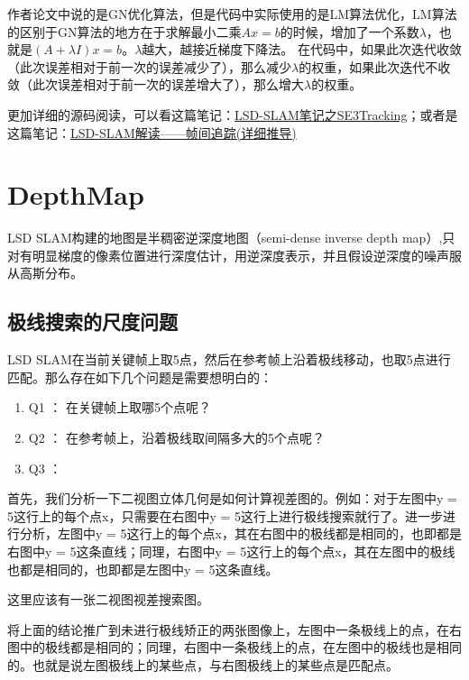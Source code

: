 作者论文中说的是GN优化算法，但是代码中实际使用的是LM算法优化，LM算法的区别于GN算法的地方在于求解最小二乘$Ax=b$的时候，增加了一个系数$\lambda$，也就是$(A+\lambda I)x=b$。$\lambda$越大，越接近梯度下降法。 在代码中，如果此次迭代收敛（此次误差相对于前一次的误差减少了），那么减少$\lambda$的权重，如果此次迭代不收敛（此次误差相对于前一次的误差增大了），那么增大$\lambda$的权重。


更加详细的源码阅读，可以看这篇笔记：\href{https://www.zybuluo.com/kokerf/note/855220}{LSD-SLAM笔记之SE3Tracking}；或者是这篇笔记：\href{https://www.baidu.com/link?url=gFb5QHUu2_4TmXHqie8m0oBYpXRHrJXFhlNW8pf9i-HOnoGS7nJXVs7YlJ88vmNC&wd=&eqid=f3e75ce0000ca6a5000000035c76477c}{LSD-SLAM解读——帧间追踪(详细推导)}


\section{DepthMap}
	
LSD SLAM构建的地图是半稠密逆深度地图（semi-dense inverse depth map）,只对有明显梯度的像素位置进行深度估计，用逆深度表示，并且假设逆深度的噪声服从高斯分布。


\subsection{极线搜索的尺度问题}
LSD SLAM在当前关键帧上取5点，然后在参考帧上沿着极线移动，也取5点进行匹配。那么存在如下几个问题是需要想明白的：

\begin{enumerate}
	\item Q1 ： 在关键帧上取哪5个点呢？
	\item Q2 ： 在参考帧上，沿着极线取间隔多大的5个点呢？
	\item Q3 ： 
\end{enumerate}



首先，我们分析一下二视图立体几何是如何计算视差图的。例如：对于左图中y = 5这行上的每个点x，只需要在右图中y = 5这行上进行极线搜索就行了。进一步进行分析，左图中y = 5这行上的每个点x，其在右图中的极线都是相同的，也即都是右图中y = 5这条直线；同理，右图中y = 5这行上的每个点x，其在左图中的极线也都是相同的，也即都是左图中y = 5这条直线。
\begin{note}
	这里应该有一张二视图视差搜索图。
\end{note}

将上面的结论推广到未进行极线矫正的两张图像上，左图中一条极线上的点，在右图中的极线都是相同的；同理，右图中一条极线上的点，在左图中的极线也是相同的。也就是说左图极线上的某些点，与右图极线上的某些点是匹配点。

